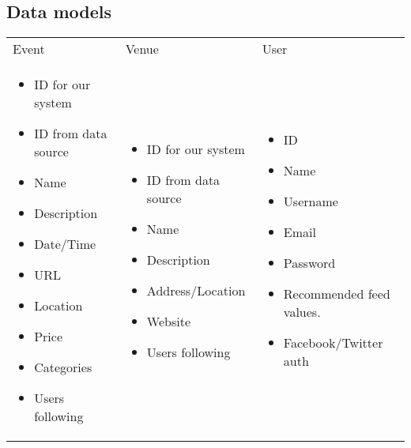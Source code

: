 \documentclass[11pt,fleqn,twoside]{article}
\begin{document}
			\subsection{Data models}
			\begin{table}
				\begin{tabular}{p{2in}p{2in}p{2in}}
					Event & Venue & User \\
					\begin{itemize}
						\item ID for our system
						\item ID from data source
						\item Name
						\item Description
						\item Date/Time
						\item URL
						\item Location
						\item Price
						\item Categories
						\item Users following 
					\end{itemize} 
					& 
					\begin{itemize}
						\item ID for our system
						\item ID from data source
						\item Name
						\item Description
						\item Address/Location
						\item Website
						\item Users following 
					\end{itemize}
					&
					\begin{itemize}
						\item ID
						\item Name
						\item Username
						\item Email
						\item Password
						\item Recommended feed values.
						\item Facebook/Twitter auth
					\end{itemize}
					 \\

				\end{tabular}
			\end{table}
\end{document}
